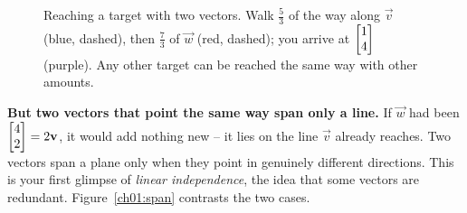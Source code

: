 \begin{figure}[htbp]
\centering
{}
\caption{Reaching a target with two vectors. Walk $\tfrac53$ of the way along $\vec v$ (blue, dashed), then
$\tfrac73$ of $\vec w$ (red, dashed); you arrive at $\begin{bmatrix}1\\4\end{bmatrix}$ (purple). Any other target can be
reached the same way with other amounts.}
\label{ch01:reach}
\end{figure}

\textbf{But two vectors that point the same way span only a line.} If $\vec w$ had been
$\begin{bmatrix}4\\2\end{bmatrix}=2\mathbf{v}$, it would add nothing new -- it lies on the line $\vec v$ already reaches. Two
vectors span a plane only when they point in genuinely different directions. This is your first
glimpse of \emph{linear independence}, the idea that some vectors are redundant.
Figure~\ref{ch01:span} contrasts the two cases.


